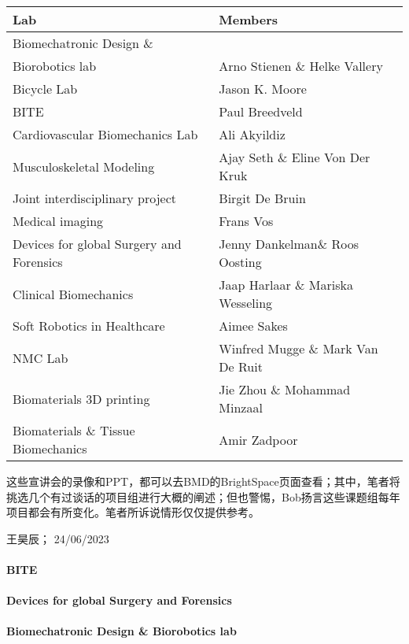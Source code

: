 \begin{center}
\begin{tabular*}{\textwidth}{@{\extracolsep{\fill}} p{} | p{}}
\textbf{Lab} & \textbf{Members} \\
\hline
Biomechatronic Design \& \\Biorobotics lab & Arno Stienen \& Helke Vallery \\
\hline
Bicycle Lab & Jason K. Moore \\
\hline
BITE & Paul Breedveld \\
\hline
Cardiovascular Biomechanics Lab & Ali Akyildiz \\
\hline
Musculoskeletal Modeling & Ajay Seth \& Eline Von Der Kruk \\
\hline
Joint interdisciplinary project & Birgit De Bruin \\
\hline
Medical imaging & Frans Vos \\
\hline
Devices for global Surgery and Forensics & Jenny Dankelman\& Roos Oosting \\
\hline
Clinical Biomechanics & Jaap Harlaar \& Mariska Wesseling \\
\hline
Soft Robotics in Healthcare & Aimee Sakes \\
\hline
NMC Lab & Winfred Mugge \& Mark Van De Ruit \\
\hline
Biomaterials 3D printing & Jie Zhou \& Mohammad Minzaal \\
\hline
Biomaterials \& Tissue Biomechanics & Amir Zadpoor \\
\end{tabular*}
\end{center}

这些宣讲会的录像和PPT，都可以去BMD的BrightSpace页面查看；其中，笔者将挑选几个有过谈话的项目组进行大概的阐述；但也警惕，Bob扬言这些课题组每年项目都会有所变化。笔者所诉说情形仅仅提供参考。
\begin{flushright}
王昊辰； 24/06/2023
\end{flushright}

\paragraph{BITE}

\paragraph{Devices for global Surgery and Forensics}

\paragraph{Biomechatronic Design \& Biorobotics lab}




